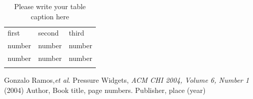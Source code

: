 %
\begin{table}
\caption{Please write your table caption here}
\label{tab:1}       %
\begin{tabular}{lll}
\hline\noalign{\smallskip}
first & second & third  \\
\noalign{\smallskip}\hline\noalign{\smallskip}
number & number & number \\
number & number & number \\
\noalign{\smallskip}\hline
\end{tabular}
\end{table}




\begin{thebibliography}{}
%
%
Gonzalo Ramos,\emph{et al}. Pressure Widgets,  \emph{ACM CHI 2004, Volume 6, Number 1} (2004)
Author, Book title, page numbers. Publisher, place (year)
\end{thebibliography}



